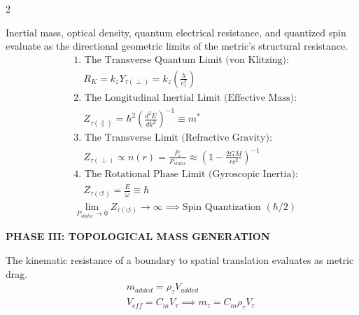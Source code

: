 \begin{multicols}{2}
\begin{tcolorbox}[cheatbox, title={\refstepcounter{cheatnum}\label{box:universal_impedance}\thecheatnum. Kinematic Vacuum Impedance ($Z_{\tau}$) \scriptsize\hfill\hyperref[sec:deriv_universal_impedance]{[Proof $\downarrow$]}}]
Inertial mass, optical density, quantum electrical resistance, and quantized spin evaluate as the directional geometric limits of the metric's structural resistance.
\begin{align}
    &\text{1. The Transverse Quantum Limit (von Klitzing):} \nonumber \\
    &\quad R_K = k_z Y_{\tau(\perp)} = k_z \left(\frac{h}{e_\tau^2}\right) \label{eq:von_klitzing_impedance} \\
    &\text{2. The Longitudinal Inertial Limit (Effective Mass):} \nonumber \\
    &\quad Z_{\tau(\parallel)} = \hbar^2 \left( \frac{d^2 E}{dk^2} \right)^{-1} \equiv m^* \label{eq:effective_mass_impedance} \\
    &\text{3. The Transverse Limit (Refractive Gravity):} \nonumber \\
    &\quad Z_{\tau(\perp)} \propto n(r) = \frac{P_c}{P_{static}} \approx \left( 1 - \frac{2GM}{rc^2} \right)^{-1} \label{eq:refractive_impedance} \\
    &\text{4. The Rotational Phase Limit (Gyroscopic Inertia):} \nonumber \\
    &\quad Z_{\tau(\circlearrowleft)} = \frac{E}{\omega} \equiv \hbar \label{eq:planck_impedance} \\
    &\lim_{P_{static} \to 0} Z_{\tau(\circlearrowleft)} \to \infty \implies \text{Spin Quantization } (\hbar/2) \label{eq:infinite_rotational_impedance}
\end{align}
\end{tcolorbox}

\newpage
\vspace{0.4cm}
\noindent\textbf{\large \color{academiabrown} PHASE III: TOPOLOGICAL MASS GENERATION}
\vspace{0.2cm}



\begin{tcolorbox}[cheatbox, title={\refstepcounter{cheatnum}\label{box:hydrodynamic_mass}\thecheatnum. The Kinematic Origin of Inertia \scriptsize\hfill\hyperref[sec:deriv_hydrodynamic_mass]{[Proof $\downarrow$]}}]
The kinematic resistance of a boundary to spatial translation evaluates as metric drag.
\begin{align}
    &\quad m_{added} = \rho_{\tau} V_{added} \label{eq:added_mass} \\
    &\quad V_{eff} = C_m V_\tau \implies m_\tau = C_m \rho_\tau V_\tau \label{eq:strain_volume_equivalence}
\end{align}
\end{tcolorbox}


\end{multicols}
